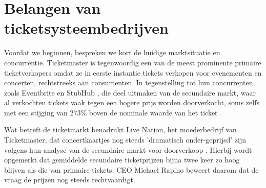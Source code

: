 \section{Belangen van ticketsysteembedrijven}



Voordat we beginnen, bespreken we kort de huidige marktsituatie en concurrentie. Ticketmaster is tegenwoordig een van de meest prominente primaire 
ticketverkopers omdat ze in eerste instantie tickets verkopen voor evenementen en concerten, rechtstreeks aan consumenten. In tegenstelling tot 
hun concurrenten, zoals Eventbrite en StubHub \cite{Competitors:online}, die deel uitmaken van de secundaire markt, waar al verkochten tickets 
vaak tegen een hogere prijs worden doorverkocht, soms zelfs met een stijging van 273\% boven de nominale waarde van het ticket \cite{tompkinsanalysis}. 

\vspace{5mm}
Wat betreft de ticketmarkt benadrukt Live Nation, het moederbedrijf van Ticketmaster, dat concertkaartjes nog steeds 'dramatisch onder-geprijsd'
zijn volgens hun analyse van de secundaire markt voor doorverkoop \cite{Daniel:online}. Hierbij wordt opgemerkt dat gemiddelde secundaire ticketprijzen 
bijna twee keer zo hoog blijven als die van primaire tickets. CEO Michael Rapino beweert daarom dat de vraag de prijzen nog steeds rechtvaardigt.

